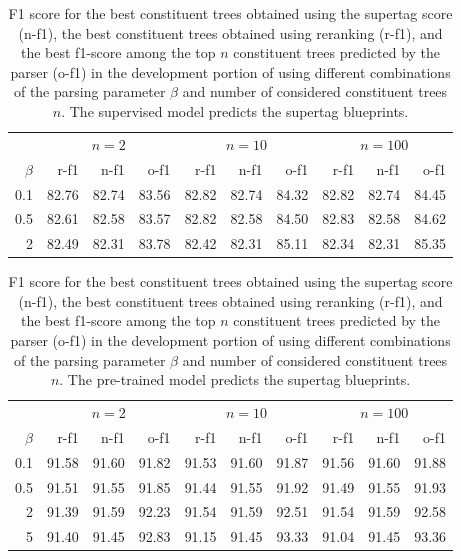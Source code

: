 \documentclass[../../document.tex]{subfiles}
\begin{document}
    \begin{table}
        \caption{\label{tbl:grid:reranking:supervised}
        F1 score for the best constituent trees obtained using the supertag score (n-f1), the best constituent trees obtained using reranking (r-f1), and the best f1-score among the top $n$ constituent trees predicted by the parser (o-f1) in the development portion of \negra{} using different combinations of the parsing parameter $\beta$ and number of considered constituent trees $n$. The supervised model predicts the supertag blueprints.
        }
        \centering
        \vspace{.2cm}
        \begin{tabular}{r|rrr|rrr|rrr}
            \toprule
       & \multicolumn{3}{c|}{$n = 2$} & \multicolumn{3}{c|}{$n = 10$}& \multicolumn{3}{c}{$n = 100$}\\
 \(\beta\) & r-f1 & n-f1 & o-f1  & r-f1 & n-f1 & o-f1 & r-f1 & n-f1 & o-f1   \\
\hline
0.1 & 82.76 & 82.74 & 83.56 & 82.82 & 82.74 & 84.32 & 82.82 & 82.74 & 84.45 \\
0.5 & 82.61 & 82.58 & 83.57 & 82.82 & 82.58 & 84.50 & 82.83 & 82.58 & 84.62 \\
  2 & 82.49 & 82.31 & 83.78 & 82.42 & 82.31 & 85.11 & 82.34 & 82.31 & 85.35 \\
\bottomrule
        \end{tabular}
    \end{table}

    \begin{table}
        \caption{\label{tbl:grid:reranking:pretrained}
        F1 score for the best constituent trees obtained using the supertag score (n-f1), the best constituent trees obtained using reranking (r-f1), and the best f1-score among the top $n$ constituent trees predicted by the parser (o-f1) in the development portion of \negra{} using different combinations of the parsing parameter $\beta$ and number of considered constituent trees $n$. The pre-trained model predicts the supertag blueprints.
        }
        \centering
        \vspace{.2cm}
        \begin{tabular}{r|rrr|rrr|rrr}
            \toprule
       & \multicolumn{3}{c|}{$n = 2$} & \multicolumn{3}{c|}{$n = 10$}& \multicolumn{3}{c}{$n = 100$}\\
 \(\beta\) & r-f1 & n-f1 & o-f1  & r-f1 & n-f1 & o-f1 & r-f1 & n-f1 & o-f1   \\
\hline
0.1 & 91.58 & 91.60 & 91.82 & 91.53 & 91.60 & 91.87 & 91.56 & 91.60 & 91.88\\
0.5 & 91.51 & 91.55 & 91.85 & 91.44 & 91.55 & 91.92 & 91.49 & 91.55 & 91.93 \\
  2 & 91.39 & 91.59 & 92.23 & 91.54 & 91.59 & 92.51 & 91.54 & 91.59 & 92.58 \\
  5 & 91.40 & 91.45 & 92.83 & 91.15 & 91.45 & 93.33 & 91.04 & 91.45 & 93.36 \\
\bottomrule
        \end{tabular}
    \end{table}
\end{document}
